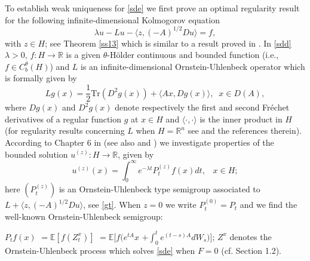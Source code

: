 \documentclass[preprint]{imsart}
\def\E{\mathbb E}
\def\R{\mathbb R}
\begin{document}
     To establish weak uniqueness  for \eqref{sde} we first  prove   
an  optimal regularity result 
 for  the following infinite-dimensional Kolmogorov equation
 \begin{equation} \label{sdd}
  \lambda u -Lu -\langle z, (-A)^{1/2} D u 
\rangle= f,   
\end{equation} 
with $z \in H$; see Theorem \ref{ss13} which  is   similar to a result proved in 
\cite{D2}.
In \eqref{sdd}  $\lambda >0$, $f: H \to \R$ is a given $\theta$-H\"older continuous and  bounded function (i.e., $f \in C_b^{\theta}(H)$)   and 
 $L$ is  an infinite-dimensional Ornstein-Uhlenbeck operator   which is  formally given by  
\begin{equation*} 
 L g(x) = \frac{1}{2} \mbox{Tr}(D^2 g(x)) +
 \langle Ax ,  Dg (x)\rangle, \;\; x \in D(A),
\end{equation*}
where $D g(x)$ and $D^2 g(x)$ denote respectively the
first and second Fr\'echet   derivatives of a regular function $g$ at $x \in H$  and $\langle \cdot, \cdot \rangle$ is the inner product in $H $ {  
(for regularity results concerning $L$  when $H = \R^n$ see \cite{lorenzi} and the references therein).} 
According to Chapter 6 in \cite{DZ1} (see also \cite{D2} and     \cite{DFPR})  we investigate properties of  the bounded  solution $u^{(z)} : H \to \R$,
 given by 
 \begin{equation}\label{dd9}  
u^{(z)}(x)= \int_0^{\infty} e^{-\lambda t } P_t^{(z)} f(x)dt, \;\;\; x \in H;
 \end{equation}
here $(P_t^{(z)})$ is an Ornstein-Uhlenbeck type semigroup associated to $L + \langle z, (-A)^{1/2} D u 
\rangle $, see \eqref{gt}.   When $z=0$ we write $P_t^{(0)} = P_t $ and we find the well-known Ornstein-Uhlenbeck  semigroup:

$
P_tf(x) $ $= \E[f(Z_t^x)] $ $ = \E \Big[f(e^{tA} x$ $ + \int_0^t e^{(t-s)A}  dW_s)\Big]
$;    $Z^x$ denotes the Ornstein-Uhlenbeck process which  solves \eqref{sde}
 when $F=0$ (cf. Section 1.2).    
\end{document}

